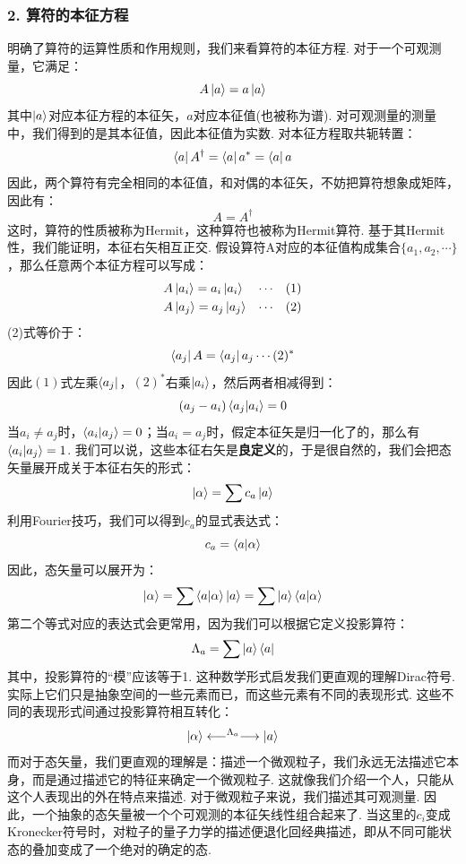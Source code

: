 \subsubsection{2. 算符的本征方程}
明确了算符的运算性质和作用规则，我们来看算符的本征方程. 对于一个可观测量，它满足：
\[
A\ket{a} = a\ket{a}
\]
其中\(\ket{a}\)对应本征方程的本征矢，\(a\)对应本征值(也被称为谱). 对可观测量的测量中，我们得到的是其本征值，因此本征值为实数. 对本征方程取共轭转置：
\[
\bra{a}A^{\dagger} = \bra{a}a^{*} = \bra{a}a
\]
因此，两个算符有完全相同的本征值，和对偶的本征矢，不妨把算符想象成矩阵，因此有：
\[
A = A^{\dagger}
\]
这时，算符的性质被称为Hermit，这种算符也被称为Hermit算符. 基于其Hermit性，我们能证明，本征右矢相互正交. 假设算符A对应的本征值构成集合\(\{a_{1},a_{2},\cdots\}\)，那么任意两个本征方程可以写成：
\begin{align*}
& A\ket{a_{i}} = a_{i}\ket{a_{i}} &\cdots && (1) \\
& A\ket{a_{j}} = a_{j}\ket{a_{j}} &\cdots && (2)
\end{align*}
(2)式等价于：
\[
\bra{a_{j}}A = \bra{a_{j}}a_{j} \cdots (2)^{*}
\]
因此\((1)\)式左乘\(\bra{a_{j}}\)，\((2)^{*}\)右乘\(\ket{a_{i}}\)，然后两者相减得到：
\[
(a_{j} - a_{i})\bra{a_{j}}\ket{a_{i}} = 0
\]
当\(a_{i}\neq a_{j}\)时，\(\bra{a_{i}}\ket{a_{j}}=0\)；当\(a_{i}=a_{j}\)时，假定本征矢是归一化了的，那么有\(\bra{a_{i}}\ket{a_{j}}=1\). 我们可以说，这些本征右矢是\textbf{良定义}的，于是很自然的，我们会把态矢量展开成关于本征右矢的形式：
\[
\ket{\alpha} = \sum c_{a}\ket{a}
\]
利用Fourier技巧，我们可以得到\(c_{a}\)的显式表达式：
\[
c_{a} = \bra{a}\ket{\alpha}
\]
因此，态矢量可以展开为：
\[
\ket{\alpha} = \sum \bra{a}\ket{\alpha}\ket{a} = \sum\ket{a}\bra{a}\ket{\alpha}
\]
第二个等式对应的表达式会更常用，因为我们可以根据它定义投影算符：
\[
\Lambda_{a} = \sum\ket{a}\bra{a}
\]
其中，投影算符的“模”应该等于1. 这种数学形式启发我们更直观的理解Dirac符号. 实际上它们只是抽象空间的一些元素而已，而这些元素有不同的表现形式. 这些不同的表现形式间通过投影算符相互转化：
\[
\ket{\alpha} \longleftarrow^{\Lambda_{a}}\longrightarrow\ket{a}
\]
而对于态矢量，我们更直观的理解是：描述一个微观粒子，我们永远无法描述它本身，而是通过描述它的特征来确定一个微观粒子. 这就像我们介绍一个人，只能从这个人表现出的外在特点来描述. 对于微观粒子来说，我们描述其可观测量. 因此，一个抽象的态矢量被一个个可观测的本征矢线性组合起来了. 当这里的\(c_{i}\)变成Kronecker符号时，对粒子的量子力学的描述便退化回经典描述，即从不同可能状态的叠加变成了一个绝对的确定的态. 
